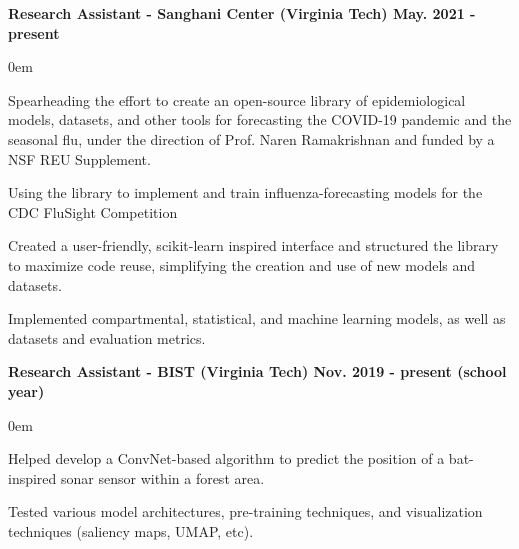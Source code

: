 \documentclass{article}
\begin{document}
\begin{center}
\begin{flushleft}
    \textbf{Research Assistant - Sanghani Center (Virginia Tech) \hfill May. 2021 - present}
    \begin{compactitem}
      \itemsep0em
      \item Spearheading the effort to create an open-source library of epidemiological models, datasets, and other tools for forecasting the COVID-19 pandemic and the seasonal flu, under the direction of Prof. Naren Ramakrishnan and funded by a NSF REU Supplement.
      \item Using the library to implement and train influenza-forecasting models for the CDC FluSight Competition
      \item Created a user-friendly, scikit-learn inspired interface and structured the library to maximize code reuse, simplifying the creation and use of new models and datasets.
      \item Implemented compartmental, statistical, and machine learning models, as well as datasets and evaluation metrics.
    \end{compactitem}

    \textbf{Research Assistant - BIST (Virginia Tech) \hfill Nov. 2019 - present (school year)}
    \begin{compactitem}
      \itemsep0em
      \item Helped develop a ConvNet-based algorithm to predict the position of a bat-inspired sonar sensor within a forest area.
      \item Tested various model architectures, pre-training techniques, and visualization techniques (saliency maps, UMAP, etc).
    \end{compactitem}


\end{flushleft}
\end{center}
\end{document}
